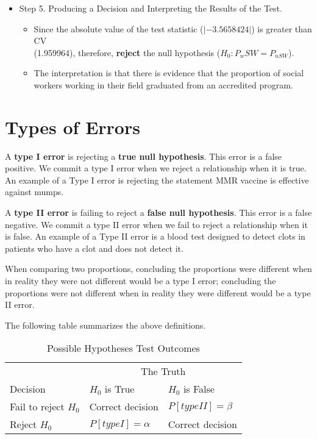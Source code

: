 \documentclass[11pt]{book}\usepackage[]{graphicx}\usepackage[]{color}
\begin{document}
\begin{itemize}
\item Step 5.  Producing a Decision and Interpreting the Results of the Test.
	\begin{itemize}
	\samepage
	\item Since the absolute value of the test statistic ($|-3.5658424|$) is greater than CV \\ (1.959964),  therefore, \textbf{reject} the null hypothesis ($H_0: P_wSW = P_{nSW}$).
	\samepage
	\item The interpretation is that there is evidence that the proportion of
social workers working in their field graduated from an accredited program.
	\end{itemize}

\end{itemize}

\section{Types of Errors}

A \textbf{type I error} is rejecting a \textbf{true null hypothesis}.  This error is a false positive.   We commit a type I error when we reject a relationship when it is true.  An example of a Type I error is rejecting the statement MMR vaccine is effective against mumps.

A \textbf{type II error} is failing to reject a \textbf{false null hypothesis}.  This error is a false negative.  We commit a type II error when we fail to reject a relationship when it is false.  An example of a Type II error is a blood test designed to detect clots in patients who have a clot and does not detect it.

When comparing two proportions, concluding the proportions were different when in reality they were not different would be a type I error; concluding the proportions were not different when in reality they were different would be a type II error.

The following table summarizes the above definitions.

\begin{table}[ht]
\centering
\caption{Possible Hypotheses Test Outcomes}
\begin{tabular}{@{} p{3cm} p{3cm} p{3cm}  @{}}
 &   \multicolumn{2}{c}{The Truth} \\
 Decision & $H_0$ is True & $H_0$ is False \\ \hline
 Fail to reject $H_0$ & Correct decision & $P[type II] = \beta$ \\
 Reject $H_0$         & $P[type I] = \alpha$ & Correct decision \\ \hline
 \end{tabular}

 \end{table}
\end{document}
